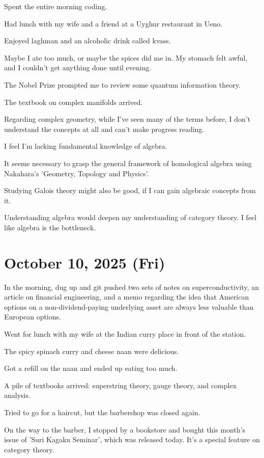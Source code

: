 \documentclass[uplatex]{jsarticle}
\begin{document}
Spent the entire morning coding.

Had lunch with my wife and a friend at a Uyghur restaurant in Ueno.

Enjoyed laghman and an alcoholic drink called kvass.

Maybe I ate too much, or maybe the spices did me in. My stomach felt awful, and I couldn't get anything done until evening.

The Nobel Prize prompted me to review some quantum information theory.

The textbook on complex manifolds arrived.

Regarding complex geometry, while I've seen many of the terms before, I don't understand the concepts at all and can't make progress reading.

I feel I'm lacking fundamental knowledge of algebra.

It seems necessary to grasp the general framework of homological algebra using Nakahara's 'Geometry, Topology and Physics'.

Studying Galois theory might also be good, if I can gain algebraic concepts from it.

Understanding algebra would deepen my understanding of category theory. I feel like algebra is the bottleneck.

\section{October 10, 2025 (Fri)}

In the morning, dug up and git pushed two sets of notes on superconductivity, an article on financial engineering, and a memo regarding the idea that American options on a non-dividend-paying underlying asset are always less valuable than European options.

Went for lunch with my wife at the Indian curry place in front of the station.

The spicy spinach curry and cheese naan were delicious.

Got a refill on the naan and ended up eating too much.

A pile of textbooks arrived: superstring theory, gauge theory, and complex analysis.

Tried to go for a haircut, but the barbershop was closed again.

On the way to the barber, I stopped by a bookstore and bought this month's issue of 'Suri Kagaku Seminar', which was released today. It's a special feature on category theory.
\end{document}
